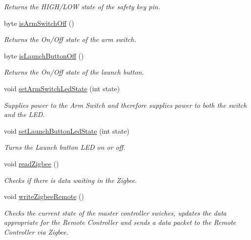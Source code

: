 \begin{DoxyCompactItemize}
\begin{DoxyCompactList}\small\item\em Returns the H\+I\+G\+H/\+L\+OW state of the safety key pin. \end{DoxyCompactList}\item 
byte \hyperlink{masterPanel_8ino_a3492c507d35bafe0970abebf4b243401}{is\+Arm\+Switch\+Off} ()
\begin{DoxyCompactList}\small\item\em Returns the On/\+Off state of the arm switch. \end{DoxyCompactList}\item 
byte \hyperlink{masterPanel_8ino_a43f47cf71ffcc34435d649543a3b2b35}{is\+Launch\+Button\+Off} ()
\begin{DoxyCompactList}\small\item\em Returns the On/\+Off state of the launch button. \end{DoxyCompactList}\item 
void \hyperlink{masterPanel_8ino_a407b3e38ec5a6e70511c19cf0c03b89d}{set\+Arm\+Switch\+Led\+State} (int state)
\begin{DoxyCompactList}\small\item\em Supplies power to the Arm Switch and therefore supplies power to both the switch and the L\+ED. \end{DoxyCompactList}\item 
void \hyperlink{masterPanel_8ino_a036de83adbfc4e042ffb2985e566dd46}{set\+Launch\+Button\+Led\+State} (int state)
\begin{DoxyCompactList}\small\item\em Turns the Launch button L\+ED on or off. \end{DoxyCompactList}\item 
void \hyperlink{masterPanel_8ino_aa52415de65bdd171ce3eefcf2439d5bb}{read\+Zigbee} ()
\begin{DoxyCompactList}\small\item\em Checks if there is data waiting in the Zigbee. \end{DoxyCompactList}\item 
void \hyperlink{masterPanel_8ino_a31e996ec809ac8f9c7b059e9ec1662dd}{write\+Zigbee\+Remote} ()
\begin{DoxyCompactList}\small\item\em Checks the current state of the master controller swiches, updates the data appropriate for the Remote Controller and sends a data packet to the Remote Controller via Zigbee. \end{DoxyCompactList}\item 

\end{DoxyCompactItemize}
